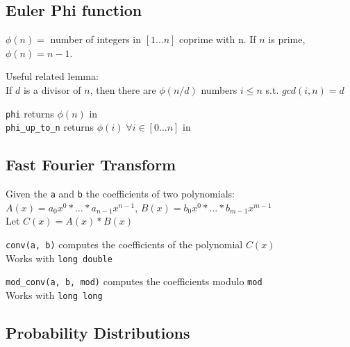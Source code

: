 \subsection{Euler Phi function}
$\phi(n) = $ number of integers in $[1\ldots n]$ coprime with n. If $n$ is prime, $\phi(n)=n-1$.

Useful related lemma: \\
If $d$ is a divisor of $n$, then there are $\phi(n / d)$ numbers $i \leq n$ s.t. $gcd(i, n) = d$

\verb|phi| returns $\phi(n)$ in  \\
\verb|phi_up_to_n| returns $\phi(i) \; \forall i \in [0 \ldots n]$ in 




\subsection{Fast Fourier Transform}

Given the \verb|a| and \verb|b| the coefficients of two polynomials: \\
$A(x) = a_0 x^0 * \ldots * a_{n-1} x^{n-1}$, $B(x) = b_0 x^0 * \ldots * b_{m-1} x^{m-1}$ \\
Let $C(x) = A(x) * B(x)$

\verb|conv(a, b)| computes the coefficients of the polynomial $C(x)$ \\
Works with \verb|long double|

\verb|mod_conv(a, b, mod)| computes the coefficients modulo \verb|mod| \\
Works with \verb|long long|




\subsection{Probability Distributions}

